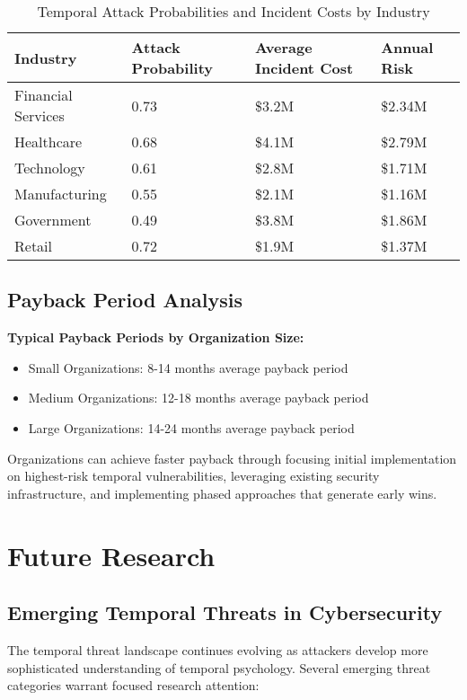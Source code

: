 \documentclass[11pt,a4paper]{article}
\begin{document}
\begin{table}[H]
\centering
\caption{Temporal Attack Probabilities and Incident Costs by Industry}
\begin{tabular}{llll}
\toprule
Industry & Attack Probability & Average Incident Cost & Annual Risk \\
\midrule
Financial Services & 0.73 & \$3.2M & \$2.34M \\
Healthcare & 0.68 & \$4.1M & \$2.79M \\
Technology & 0.61 & \$2.8M & \$1.71M \\
Manufacturing & 0.55 & \$2.1M & \$1.16M \\
Government & 0.49 & \$3.8M & \$1.86M \\
Retail & 0.72 & \$1.9M & \$1.37M \\
\bottomrule
\end{tabular}
\end{table}

\subsection{Payback Period Analysis}

\textbf{Typical Payback Periods by Organization Size:}
\begin{itemize}
\item Small Organizations: 8-14 months average payback period
\item Medium Organizations: 12-18 months average payback period
\item Large Organizations: 14-24 months average payback period
\end{itemize}

Organizations can achieve faster payback through focusing initial implementation on highest-risk temporal vulnerabilities, leveraging existing security infrastructure, and implementing phased approaches that generate early wins.

\section{Future Research}

\subsection{Emerging Temporal Threats in Cybersecurity}

The temporal threat landscape continues evolving as attackers develop more sophisticated understanding of temporal psychology. Several emerging threat categories warrant focused research attention:
\end{document}
